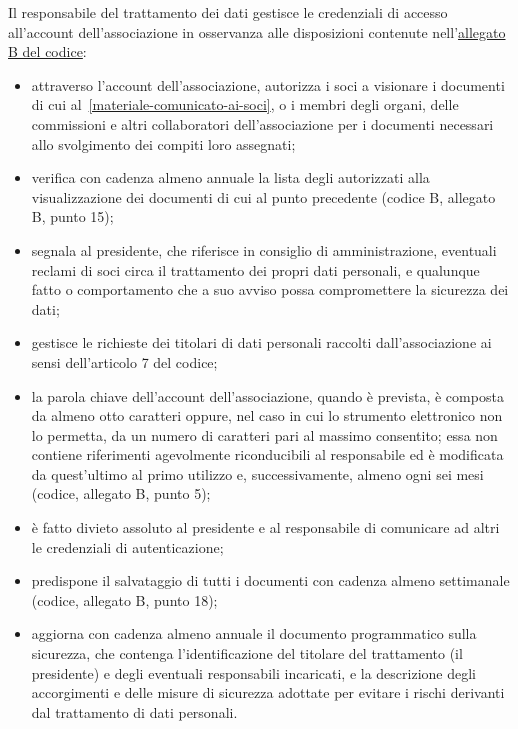 Il responsabile del trattamento dei dati gestisce le credenziali di accesso
all'account dell'associazione in osservanza alle disposizioni
contenute
nell'\href{http://www.garanteprivacy.it/web/guest/home/docweb/-/docweb-display/docweb/1557184}{allegato
B del codice}:
\begin{itemize}
    \item attraverso l'account dell'associazione, autorizza i soci a
        visionare i documenti di cui al~\ref{materiale-comunicato-ai-soci},
        o i membri degli organi, delle commissioni e altri collaboratori
        dell'associazione per i documenti necessari allo svolgimento dei
        compiti loro assegnati;
    \item verifica con cadenza almeno annuale la lista degli 
        autorizzati alla visualizzazione dei documenti di cui al punto
        precedente (codice B, allegato B, punto 15);
    \item segnala al presidente, che riferisce in consiglio di
        amministrazione, eventuali reclami di soci circa il
        trattamento dei propri dati personali, e qualunque fatto o
        comportamento che a suo avviso possa compromettere la sicurezza dei
        dati;
    \item gestisce le richieste dei titolari di dati personali raccolti
        dall'associazione ai sensi dell'articolo 7 del codice;
    \item la parola chiave dell'account dell'associazione, quando è prevista,
        è composta da almeno otto caratteri oppure, nel caso in cui lo
        strumento elettronico non lo permetta, da un numero di caratteri
        pari al massimo consentito; essa non contiene riferimenti
        agevolmente riconducibili al responsabile ed è modificata da
        quest'ultimo al primo utilizzo e, successivamente, almeno ogni sei
        mesi (codice, allegato B, punto 5);
    \item è fatto divieto assoluto al presidente e al responsabile di
        comunicare ad altri le credenziali di autenticazione;
    \item predispone il salvataggio di tutti i documenti con cadenza almeno
        settimanale (codice, allegato B, punto 18);
    \item aggiorna con cadenza almeno annuale il documento programmatico
        sulla sicurezza, che contenga l'identificazione del titolare del
        trattamento (il presidente) e degli eventuali responsabili
        incaricati, e la descrizione degli accorgimenti e delle misure di
        sicurezza adottate per evitare i rischi derivanti dal trattamento di
        dati personali.
\end{itemize}
